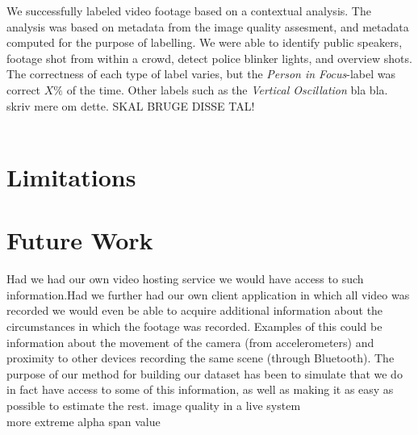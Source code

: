 We successfully labeled video footage based on a contextual analysis. The analysis was based on metadata from the image quality assesment, and metadata computed for the purpose of labelling. We were able to identify public speakers, footage shot from within a crowd, detect police blinker lights, and overview shots. 
\\
The correctness of each type of label varies, but the \emph{Person in Focus}-label was correct $X\%$ of the time. Other labels such as the \emph{Vertical Oscillation} bla bla. skriv mere om dette. SKAL BRUGE DISSE TAL!\\\\

%
\section{Limitations}\label{sec:conc_lims}
%
\section{Future Work}\label{sec:futurework}
%
Had we had our own video hosting service we would have access to such information.Had we further had our own client application in which all video was recorded we would even be able to acquire additional information about the circumstances in which the footage was recorded. Examples of this could be information about the movement of the camera (from accelerometers) and proximity to other devices recording the same scene (through Bluetooth). The purpose of our method for building our dataset has been to simulate that we do in fact have access to some of this information, as well as making it as easy as possible to estimate the rest.
%
image quality in a live system\\
more extreme alpha span value